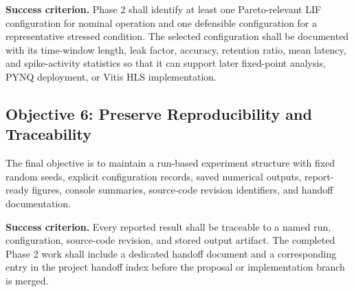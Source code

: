 \textbf{Success criterion.} Phase 2 shall identify at least one Pareto-relevant LIF configuration for nominal operation and one defensible configuration for a representative stressed condition. The selected configuration shall be documented with its time-window length, leak factor, accuracy, retention ratio, mean latency, and spike-activity statistics so that it can support later fixed-point analysis, PYNQ deployment, or Vitis HLS implementation.

\subsection{Objective 6: Preserve Reproducibility and Traceability}

The final objective is to maintain a run-based experiment structure with fixed random seeds, explicit configuration records, saved numerical outputs, report-ready figures, console summaries, source-code revision identifiers, and handoff documentation.

\textbf{Success criterion.} Every reported result shall be traceable to a named run, configuration, source-code revision, and stored output artifact. The completed Phase 2 work shall include a dedicated handoff document and a corresponding entry in the project handoff index before the proposal or implementation branch is merged.